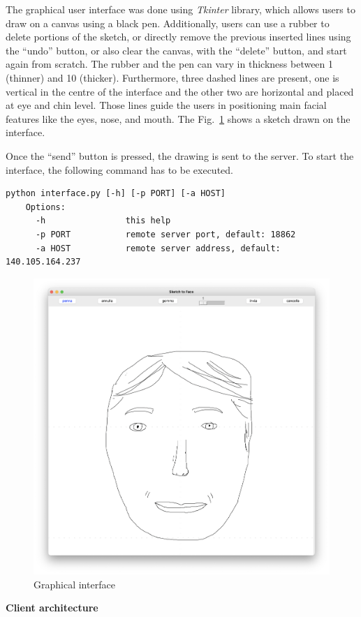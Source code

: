 \noindent The graphical user interface was done using \textit{Tkinter} library, which allows users to draw on a canvas using a black pen. Additionally, users can use a rubber to delete portions of the sketch, or directly remove the previous inserted lines using the “undo” button, or also clear the canvas, with the “delete” button, and start again from scratch. The rubber and the pen can vary in thickness between 1 (thinner) and 10 (thicker). 
Furthermore, three dashed lines are present, one is vertical in the centre of the interface and the other two are horizontal and placed at eye and chin level. Those lines guide the users in positioning main facial features like the eyes, nose, and mouth. The Fig.~\ref{fig:Graphical interface} shows a sketch drawn on the interface.

\noindent Once the “send” button is pressed, the drawing is sent to the server.
To start the interface, the following command has to be executed.
\begin{lstlisting}[numbers=none]
    python interface.py [-h] [-p PORT] [-a HOST]
    Options:
      -h                this help
      -p PORT           remote server port, default: 18862
      -a HOST           remote server address, default: 140.105.164.237
\end{lstlisting}
\begin{figure}[htbp]
\centering
  \includegraphics[scale=0.15]{figures/interface.png}
  \caption{Graphical interface}
  \label{fig:Graphical interface}
\end{figure}
\medskip
\textbf{Client architecture}

